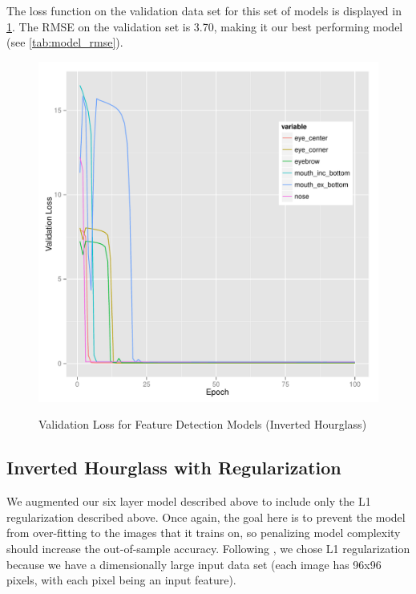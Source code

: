 \documentclass[journal]{IEEEtran}
\begin{document}
The loss function on the validation data set for this set of models is displayed in \cref{fig:val_loss_6_level_inverted_hourglass}. The RMSE on the validation set is 3.70, making it our best performing model (see \cref{tab:model_rmse}).

\begin{figure}[!htb]
  \centering
  \caption{Validation Loss for Feature Detection Models (Inverted Hourglass)}
  \includegraphics[scale=.49]{val_loss_6_level_inverted_hourglass.pdf}
  \label{fig:val_loss_6_level_inverted_hourglass}
\end{figure}

\subsection{Inverted Hourglass with Regularization}

We augmented our six layer model described above to include only the L1 regularization described above. Once again, the goal here is to prevent the model from over-fitting to the images that it trains on, so penalizing model complexity should increase the out-of-sample accuracy. Following \cite{ng2004feature}, we chose L1 regularization because we have a dimensionally large input data set (each image has 96x96 pixels, with each pixel being an input feature). 
\end{document}
